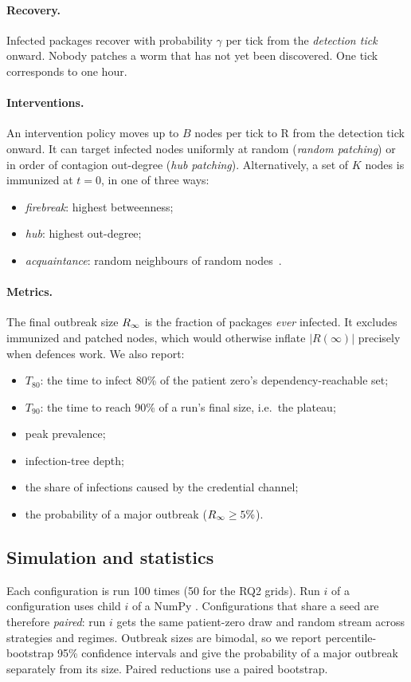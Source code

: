 \paragraph{Recovery.} Infected packages recover with probability $\gamma$ per tick from the
\emph{detection tick} onward. Nobody patches a worm that has not yet been discovered. One tick
corresponds to one hour.

\paragraph{Interventions.} An intervention policy moves up to $B$ nodes per tick to R from the detection
tick onward. It can target infected nodes uniformly at random (\emph{random patching}) or in order of
contagion out-degree (\emph{hub patching}). Alternatively, a set of $K$ nodes is immunized at $t=0$, in
one of three ways:
\begin{itemize}
  \item \emph{firebreak}: highest betweenness;
  \item \emph{hub}: highest out-degree;
  \item \emph{acquaintance}: random neighbours of random nodes~\citep{cohen2003acquaintance}.
\end{itemize}

\paragraph{Metrics.} The final outbreak size $R_\infty$ is the fraction of packages \emph{ever} infected.
It excludes immunized and patched nodes, which would otherwise inflate $|R(\infty)|$ precisely when
defences work. We also report:
\begin{itemize}
  \item $T_{80}$: the time to infect 80\% of the patient zero's dependency-reachable set;
  \item $T_{90}$: the time to reach 90\% of a run's final size, i.e.\ the plateau;
  \item peak prevalence;
  \item infection-tree depth;
  \item the share of infections caused by the credential channel;
  \item the probability of a major outbreak ($R_\infty\geq5\%$).
\end{itemize}

\subsection{Simulation and statistics}
Each configuration is run 100 times (50 for the RQ2 grids). Run $i$ of a configuration uses child $i$
of a NumPy . Configurations that share a seed are therefore \emph{paired}: run $i$
gets the same patient-zero draw and random stream across strategies and regimes. Outbreak sizes are
bimodal, so we report percentile-bootstrap 95\% confidence intervals and give the probability of a major
outbreak separately from its size. Paired reductions use a paired bootstrap.


